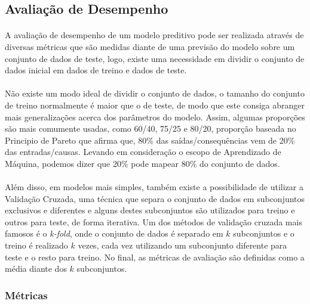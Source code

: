 \documentclass[grad,numbers]{coppe}
\begin{document}
		\subsection{Avaliação de Desempenho}
			\paragraph{}A avaliação de desempenho de um modelo preditivo pode ser realizada através de diversas métricas que são medidas diante de uma previsão do modelo sobre um conjunto de dados de teste, logo, existe uma necessidade em dividir o conjunto de dados inicial em dados de treino e dados de teste.
			\paragraph{}Não existe um modo ideal de dividir o conjunto de dados, o tamanho do conjunto de treino normalmente é maior que o de teste, de modo que este consiga abranger mais generalizações acerca dos parâmetros do modelo. Assim, algumas proporções são mais comumente usadas, como 60/40, 75/25 e 80/20, proporção baseada no Principio de Pareto que afirma que, 80\% das saídas/consequências vem de 20\% das entradas/causas\cite{pareto_principle}. Levando em consideração o escopo de Aprendizado de Máquina, podemos dizer que 20\% pode mapear 80\% do conjunto de dados.
			\paragraph{}Além disso, em modelos mais simples, também existe a possibilidade de utilizar a Validação Cruzada, uma técnica que separa o conjunto de dados em subconjuntos exclusivos e diferentes e alguns destes subconjuntos são utilizados para treino e outros para teste, de forma iterativa. Um dos métodos de validação cruzada mais famosos é o \textit{k-fold}, onde o conjunto de dados é separado em $k$ subconjuntos e o treino é realizado $k$ vezes, cada vez utilizando um subconjunto diferente para teste e o resto para treino\cite{k-fold}. No final, as métricas de avaliação são definidas como a média diante dos $k$ subconjuntos.
			\subsubsection{Métricas}
\end{document}
